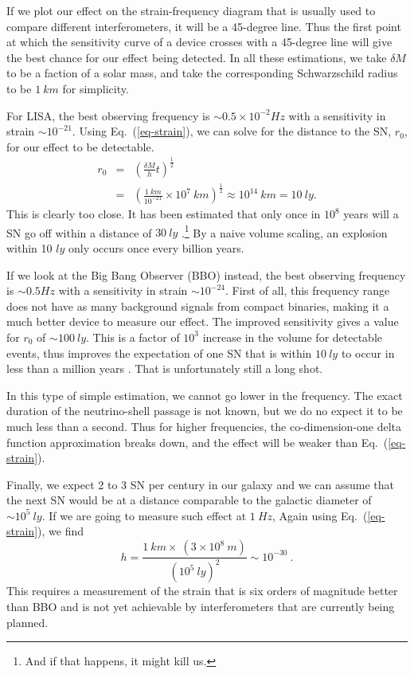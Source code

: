 \documentclass[aps,showpacs,onecolumn,floats,prd,superscriptaddress,nofootinbib]{revtex4-1}
\begin{document}
If we plot our effect on the strain-frequency diagram \cite{GWcurves} that is usually used to compare different interferometers, it will be a 45-degree line. Thus the first point at which the sensitivity curve of a device crosses with a 45-degree line will give the best chance for our effect being detected. In all these estimations, we take $\delta M$ to be a faction of a solar mass, and take the corresponding Schwarzschild radius to be $1~km$ for simplicity.

For LISA, the best observing frequency is $\sim 0.5 \times10^{-2} Hz$ with a sensitivity in strain $\sim 10^{-21}$. Using Eq.~(\ref{eq-strain}), we can solve for the distance to the SN, $r_0$, for our effect to be detectable.
\begin{eqnarray}
	r_0 & = &  \left(  \frac{\delta M}{h} t \right)^\frac{1}{2} \label{Meas}	\\
	& = &  \left( \frac{1 \ km}{10^{-21}} \times 10^7 \ km \right)^\frac{1}{2} \approx 10^{14} \ km = 10 \ ly.
\end{eqnarray}
This is clearly too close. It has been estimated that only once in $10^8$ years will a SN go off within a distance of $30 \ ly$ \cite{EllSch93}.\footnote{And if that happens, it might kill us.} By a naive volume scaling, an explosion within 10 $ly$ only occurs once every billion years.

If we look at the Big Bang Observer (BBO) instead, the best observing frequency is $\sim 0.5 Hz$ with a sensitivity in strain $\sim 10^{-24}$. First of all, this frequency range does not have as many background signals from compact binaries, making it a much better device to measure our effect. The improved sensitivity gives a value for $r_0$ of $\sim 100 \ ly$. This is a factor of $10^3$ increase in the volume for detectable events, thus improves the expectation of one SN that is within $10 \ ly$ to occur in less than a million years . That is unfortunately still a long shot.

In this type of simple estimation, we cannot go lower in the frequency. The exact duration of the neutrino-shell passage is not known, but we do no expect it to be much less than a second. Thus for higher frequencies, the co-dimension-one delta function approximation breaks down, and the effect will be weaker than Eq.~(\ref{eq-strain}).

Finally, we expect 2 to 3 SN per century in our galaxy and we can assume that the next SN would be at a distance comparable to the galactic diameter of $\sim 10^5 \ ly$. If we are going to measure such effect at $1 \ Hz$, Again using Eq.~(\ref{eq-strain}), we find
\begin{equation}
	h = \frac{ 1~km \times ~ (3\times10^8~m)}{(10^5~ly)^2}\sim 10^{-30}~.
\end{equation}
This requires a measurement of the strain that is six orders of magnitude better than BBO and is not yet achievable by interferometers that are currently being planned. 
\end{document}
